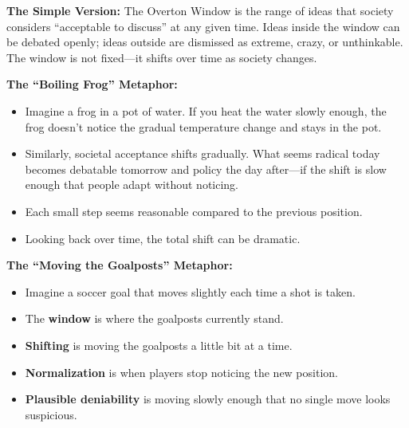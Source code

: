 \begin{tcolorbox}[colback=green!5!white,colframe=green!65!black,title=\textbf{Plain English: What is the Overton Window?},breakable]

\textbf{The Simple Version:}
The Overton Window is the range of ideas that society considers ``acceptable to discuss''
at any given time. Ideas inside the window can be debated openly; ideas outside are
dismissed as extreme, crazy, or unthinkable. The window is not fixed---it shifts
over time as society changes.

\textbf{The ``Boiling Frog'' Metaphor:}
\begin{itemize}
    \item Imagine a frog in a pot of water. If you heat the water slowly enough,
          the frog doesn't notice the gradual temperature change and stays in the pot.
    \item Similarly, societal acceptance shifts gradually. What seems radical today
          becomes debatable tomorrow and policy the day after---if the shift is
          slow enough that people adapt without noticing.
    \item Each small step seems reasonable compared to the previous position.
    \item Looking back over time, the total shift can be dramatic.
\end{itemize}

\textbf{The ``Moving the Goalposts'' Metaphor:}
\begin{itemize}
    \item Imagine a soccer goal that moves slightly each time a shot is taken.
    \item The \textbf{window} is where the goalposts currently stand.
    \item \textbf{Shifting} is moving the goalposts a little bit at a time.
    \item \textbf{Normalization} is when players stop noticing the new position.
    \item \textbf{Plausible deniability} is moving slowly enough that no single move
          looks suspicious.
\end{itemize}


\end{tcolorbox}
